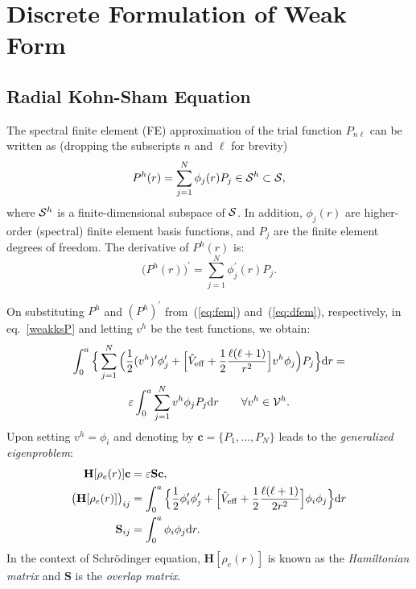 \documentclass[12pt,dvipsnames]{article}
\newcommand{\eref}[1]{(\ref{#1})}
\newcommand{\vm}[1]{\mathbf{#1}}
\begin{document}
\section{Discrete Formulation of Weak Form}
\subsection{Radial Kohn-Sham Equation}
The spectral finite element (FE) approximation of the trial function $P_{n \ell}$ 
can be written as (dropping the subscripts $n$ and $\ell$ for brevity)
\begin{equation}	\label{eq:fem}
P^h (r) = \sum_{j=1}^N \phi_j(r) P_j \in {\cal S}^h \subset {\cal S},
\end{equation}
where ${\cal S}^h$ is a finite-dimensional subspace of ${\cal S}$. In
addition, $\phi_j(r)$ are higher-order (spectral) finite element 
basis functions, and $P_j$ are the finite element degrees of freedom. 
The derivative of $P^h(r)$ is:
\begin{equation}\label{eq:dfem}
\bigl(P^h(r)\bigr)^\prime = \sum_{j=1}^N \phi_j^\prime (r) P_j.
\end{equation}

\noindent
On substituting $P^h$ and $(P^h)^\prime$ from~\eref{eq:fem} and~\eref{eq:dfem}, respectively, in eq.~\eqref{weakksP}
 and letting $v^h$ be the test functions, we obtain:
\begin{multline*}
\int_0^a \Big\{ \sum_{j=1}^N \Big( \frac{1}{2} (v^h)^\prime \phi_j^\prime + 
\Big[ \hat{V}_{\rm{eff}} + \frac{1}{2}\frac{\ell(\ell + 1)}{r^2} \Big ] v^h \phi_j \Big ) P_j \Big\} \mathrm{d} r = \\
\varepsilon \int_0^a \sum_{j=1}^N v^h \phi_j P_j \mathrm{d} r \qquad \forall v^h \in {\cal V}^h.
\end{multline*}
Upon setting $v^h = \phi_i$ and denoting by $\vm{c} = \{P_1, \ldots, P_N\}$ leads to the \emph{ generalized eigenproblem}:
\begin{subequations}\label{eq:eigproblem}
\begin{align}
\vm{H} [\rho_e(r)] \vm{c} &= \varepsilon \vm{S} \vm{c}, \label{geneig}\\
\big(\vm{H}[\rho_e(r)]\big)_{ij} & = \int_0^a \Big\{ \frac{1}{2} \phi_i^\prime \phi_j^\prime + 
\Big[ \hat{V}_{\rm{eff}} + \frac{1}{2} \frac{\ell(\ell + 1)}{2 r^2} \Big ] \phi_i \phi_j \Big\} \mathrm{d} r \\
\vm{S}_{ij} & =  \int_0^a \phi_i \phi_j \mathrm{d} r.
\end{align}
\end{subequations} 
In the context of Schr\"odinger equation, $\vm{H}[\rho_e(r)]$ is known as the \emph{Hamiltonian matrix} and 
$\vm{S}$ is the \emph{overlap matrix}.
%
\end{document}
